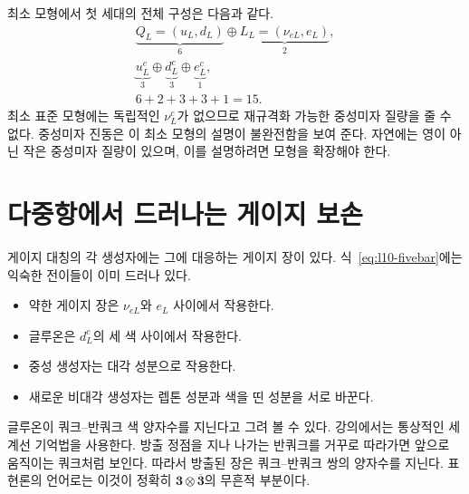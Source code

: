 최소 모형에서 첫 세대의 전체 구성은 다음과 같다.
\begin{equation}
\begin{gathered}
\underbrace{Q_L=(u_L,d_L)}_{6}
\oplus
\underbrace{L_L=(\nu_{eL},e_L)}_{2},\\
\underbrace{u^c_L}_{3}
\oplus
\underbrace{d^c_L}_{3}
\oplus
\underbrace{e^c_L}_{1},\\
6+2+3+3+1=15.
\end{gathered}
\label{eq:l10-fifteen}
\end{equation}
최소 표준 모형에는 독립적인 \(\nu^c_L\)가 없으므로 재규격화 가능한 중성미자 질량을 줄 수 없다. 중성미자 진동은 이 최소 모형의 설명이 불완전함을 보여 준다. 자연에는 영이 아닌 작은 중성미자 질량이 있으며, 이를 설명하려면 모형을 확장해야 한다.

\begin{classroomqa}
\end{classroomqa}

\section{다중항에서 드러나는 게이지 보손}

게이지 대칭의 각 생성자에는 그에 대응하는 게이지 장이 있다. 식~\eqref{eq:l10-fivebar}에는 익숙한 전이들이 이미 드러나 있다.
\begin{itemize}
\item 약한 게이지 장은 \(\nu_{eL}\)와 \(e_L\) 사이에서 작용한다.
\item 글루온은 \(d^c_L\)의 세 색 사이에서 작용한다.
\item 중성 생성자는 대각 성분으로 작용한다.
\item 새로운 비대각 생성자는 렙톤 성분과 색을 띤 성분을 서로 바꾼다.
\end{itemize}

글루온이 쿼크--반쿼크 색 양자수를 지닌다고 그려 볼 수 있다. 강의에서는 통상적인 세계선 기억법을 사용한다. 방출 정점을 지나 나가는 반쿼크를 거꾸로 따라가면 앞으로 움직이는 쿼크처럼 보인다. 따라서 방출된 장은 쿼크--반쿼크 쌍의 양자수를 지닌다. 표현론의 언어로는 이것이 정확히 \(\mathbf3\otimes\overline{\mathbf3}\)의 무흔적 부분이다.

